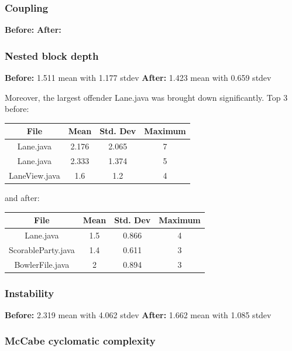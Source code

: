 \subsubsection{Coupling}
\textbf{Before:}
\textbf{After:}

\subsubsection{Nested block depth}
\textbf{Before:} 1.511 mean with 1.177 stdev
\textbf{After:} 1.423 mean with 0.659 stdev

Moreover, the largest offender Lane.java was brought down significantly. Top 3 before:

\begin{tabular}{ |c|c|c|c| }
    \hline
    \textbf{File}       & \textbf{Mean} & \textbf{Std. Dev} & \textbf{Maximum} \\
    \hline
    Lane.java & 2.176          & 2.065             & 7                \\
    Lane.java           & 2.333         & 1.374             & 5                \\
    LaneView.java       & 1.6             & 1.2             & 4                \\
    \hline
\end{tabular}

and after:

\begin{tabular}{ |c|c|c|c| }
    \hline
    \textbf{File}       & \textbf{Mean} & \textbf{Std. Dev} & \textbf{Maximum} \\
    \hline
    Lane.java           & 1.5           & 0.866             & 4                \\
    ScorableParty.java           & 1.4           & 0.611             & 3                \\
    BowlerFile.java       & 2             & 0.894             & 3                \\
    \hline
\end{tabular}

\subsubsection{Instability}

\textbf{Before:} 2.319 mean with 4.062 stdev
\textbf{After:} 1.662 mean with 1.085 stdev


\subsubsection{McCabe cyclomatic complexity}

